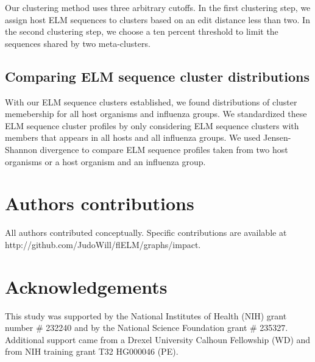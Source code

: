 \documentclass[10pt]{bmc_article}
\newenvironment{bmcformat}{\begin{raggedright}\baselineskip20pt\sloppy\setboolean{publ}{false}}{\end{raggedright}\baselineskip20pt\sloppy}
\begin{document}
\begin{bmcformat}
Our clustering method uses three arbitrary cutoffs. In the first
clustering step, we assign host ELM sequences to clusters based on an
edit distance less than two. In the second clustering step, we choose
a ten percent threshold to limit the sequences shared by two
meta-clusters.

\subsection*{Comparing ELM sequence cluster distributions}
With our ELM sequence clusters established, we found distributions of
cluster memebership for all host organisms and influenza groups.  We
standardized these ELM sequence cluster profiles by only considering
ELM sequence clusters with members that appears in all hosts and all
influenza groups. We used Jensen-Shannon divergence
\cite{lin1991divergence} to compare ELM sequence profiles taken from
two host organisms or a host organism and an influenza group.
  
\section*{Authors contributions}
    All authors contributed conceptually. Specific contributions are
    available at http://github.com/JudoWill/flELM/graphs/impact.

\section*{Acknowledgements}
  This study was supported by the National Institutes of Health
  (NIH) grant number \# 232240 and by the National Science Foundation
  grant \# 235327. Additional support came from a Drexel University
  Calhoun Fellowship (WD) and from NIH training grant T32 HG000046
  (PE).
 


\end{bmcformat}
\end{document}
